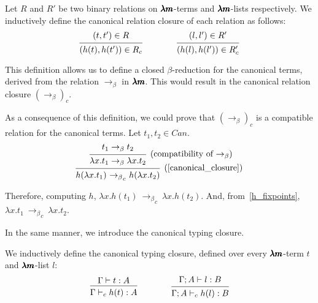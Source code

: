 \begin{definition}
  \label{canonical_closure}
  Let $R$ and $R'$ be two binary relations on $\pmb{\lambda m}$-terms and $\pmb{\lambda m}$-lists respectively.
  We inductively define the canonical relation closure of each relation as follows:
  \[
    \begin{prooftree}
      \hypo{ (t, t') \in R }
      \infer1{ (h(t), h(t')) \in R_c } 
    \end{prooftree}
    \qquad \qquad
    \begin{prooftree}
      \hypo{ (l, l') \in R' }
      \infer1{ (h(l), h(l')) \in R'_c } 
    \end{prooftree}
  \]
\end{definition}


This definition allows us to define a closed $\beta$-reduction for the canonical terms, derived from the relation $\to_\beta$ in $\pmb{\lambda m}$. This would result in the canonical relation closure ${(\to_\beta)}_c$.

As a consequence of this definition, we could prove that ${(\to_\beta)}_c$ is a compatible relation for the canonical terms.
Let $t_1, t_2 \in Can$.
\[ \begin{prooftree}
    \hypo{ t_1 \to_\beta t_2 }
    \infer1[\text{(compatibility of $\to_\beta$)}]{ \lambda x.t_1 \to_\beta \lambda x.t_2 }
    \infer1[\text{(\cref{canonical_closure})}]{ h(\lambda x.t_1) \ {\to_\beta}_c \ h(\lambda x.t_2) }
  \end{prooftree} \]

Therefore, computing $h$, $\lambda x.h(t_1) \ {\to_\beta}_c \ \lambda x.h(t_2)$.
And, from~\cref{h_fixpoints}, $\lambda x.t_1 \ {\to_\beta}_c \ \lambda x.t_2$.

In the same manner, we introduce the canonical typing closure.

\begin{definition}
  \label{canonical_typing}
  We inductively define the canonical typing closure, defined over every $\pmb{\lambda m}$-term $t$ and $\pmb{\lambda m}$-list $l$:
  \[
    \begin{prooftree}
      \hypo{ \Gamma \vdash t:A }
      \infer1{ \Gamma \vdash_c h(t):A } 
    \end{prooftree}
    \qquad \qquad
    \begin{prooftree}
      \hypo{ \Gamma ; A \vdash l:B }
      \infer1{ \Gamma ; A \vdash_c h(l):B }.
    \end{prooftree}
  \]
\end{definition}

